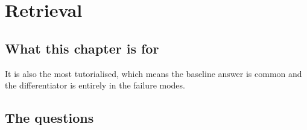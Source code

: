 \chapter{Retrieval}
\label{ch:retrieval}

\section*{What this chapter is for}

 It is also the most tutorialised, which means the
baseline answer is common and the differentiator is entirely in the failure
modes.

\section*{The questions}

